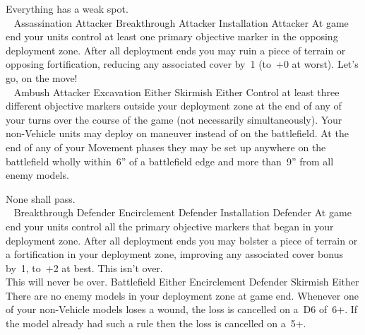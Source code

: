 \noindent%
%
{Everything has a weak spot.\\~}%
{Assassination}%
{Attacker}%
{Breakthrough}%
{Attacker}%
{Installation}%
{Attacker}%
{At game end your units control at least one primary objective marker
  in the opposing deployment zone.}%
{After all deployment ends you may ruin a piece of terrain or opposing fortification,
reducing any associated cover by~1 (to~+0 at worst).}
\hfill
%
{Let's go, on the move!\\~}%
{Ambush}%
{Attacker}%
{Excavation}%
{Either}%
{Skirmish}%
{Either}%
{Control at least three different objective
  markers outside your deployment zone at the end of any of your turns over the course of the game (not necessarily
  simultaneously).}%
%
{Your non-Vehicle units may deploy on maneuver
instead of on the battlefield.  At the end of any of your Movement phases they may be set up anywhere on the battlefield wholly within~6'' of a battlefield edge and more than~9'' from all enemy models.}

\vfill


\noindent%
%
{None shall pass.\\~}%
{Breakthrough}%
{Defender}%
{Encirclement}%
{Defender}%
{Installation}%
{Defender}%
{At game end your units control all the primary objective markers that
  began in your deployment zone.}%
{After all deployment ends you may bolster a piece of terrain or a
  fortification in your deployment zone, improving any associated
  cover bonus by~1, to~+2 at best.}
\hfill
%
{This isn't over.\\This will never be over.}%
{Battlefield}%
{Either}%
{Encirclement}%
{Defender}%
{Skirmish}%
{Either}%
{There are no enemy models in your deployment zone at
  game end.}%
{Whenever one of your non-Vehicle models loses a wound, the loss is cancelled
on a~D6 of~6+. If the model already had such a rule then the loss is cancelled on a~5+.}


\clearpage
\restorebackground

